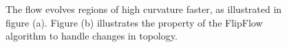 \begin{figure}
\center
{}

\caption{ The flow evolves regions of high curvature faster, as illustrated in figure (a). Figure (b) illustrates the property of the FlipFlow algorithm to handle changes in topology.}
\label{ch6:fig:handle-topology-different-speed}
\end{figure}

